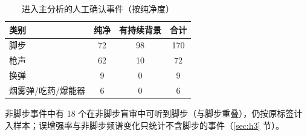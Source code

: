 \begin{table}[htbp]\centering
\caption{进入主分析的人工确认事件（按纯净度）}\label{tab:sample}
{\small\begin{threeparttable}
\begin{tabular}{lccc}\toprule
类别 & 纯净 & 有持续背景 & 合计 \\
\midrule
脚步 & 72 & 98 & 170 \\
枪声 & 62 & 10 & 72 \\
换弹 & 9 & 0 & 9 \\
烟雾弹/吃药/爆能器 & 6 & 0 & 6 \\
\bottomrule\end{tabular}
\begin{tablenotes}\footnotesize\item 非脚步事件中有 18 个在非脚步盲审中可听到脚步（与脚步重叠），仍按原标签计入样本；误增强率与非脚步频谱变化只统计不含脚步的事件（\ref{sec:h3} 节）。\end{tablenotes}\end{threeparttable}}
\end{table}
